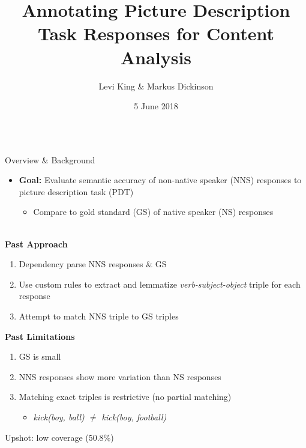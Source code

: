 \documentclass[final,t]{beamer}
\title[]{Annotating Picture Description Task Responses for Content Analysis}
\author[]{Levi King \& Markus Dickinson}
\institute[]{Indiana University}
\date[]{5 June 2018}
\begin{document}
\begin{frame}{}
\vspace{-1.3em}
  \begin{columns}[t]
    \begin{column}{.33\linewidth}

\begin{block}{Overview \& Background}
  \begin{itemize}
    \itemsep1em
  \item{\textbf{Goal:} Evaluate semantic accuracy of non-native speaker (NNS) responses to picture description task (PDT) 
      \begin{itemize}
      \item Compare to gold standard (GS) of native speaker (NS) responses
      \end{itemize}
    }
\end{itemize}
    \begin{center}
      \mbox{}\\[-1em]\textbf{Past Approach}
    \end{center}
      \begin{center}\begin{minipage}{.8\textwidth}
      \begin{enumerate}
      \item Dependency parse NNS responses \& GS
      \item Use custom rules to extract and lemmatize
        \textit{verb-subject-object} triple for each response
      \item Attempt to match NNS triple to GS triples
      \end{enumerate}
      \end{minipage}\end{center}

    \begin{center}
      \textbf{Past Limitations} 
    \end{center}
      \begin{center}\begin{minipage}{.8\textwidth}
      \begin{enumerate}
      \item GS is small
      \item NNS responses show more variation than NS responses
      \item Matching exact triples is restrictive (no partial matching)
        \begin{itemize}
        \item{\textit{kick(boy, ball) $\neq$ kick(boy, football)}}
        \end{itemize}
      \end{enumerate}
      \begin{center}
        Upshot: low coverage (50.8\%)
      \end{center}
      \end{minipage}\end{center}


\end{block}
\end{column}
\end{columns}
\end{frame}
\end{document}
